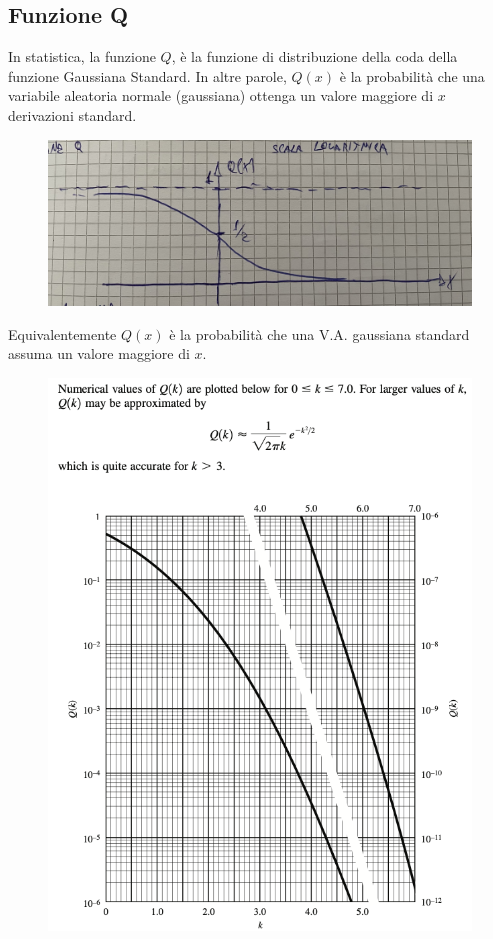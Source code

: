 \documentclass{article}
\begin{document}
\subsection{Funzione Q}

In statistica, la funzione \(Q\), è la funzione di distribuzione della coda della funzione Gaussiana Standard.
In altre parole, \(Q(x)\) è la probabilità che una variabile aleatoria normale (gaussiana) ottenga un valore maggiore di  \(x\) derivazioni standard.
\begin{figure}[h]
\centering
\includegraphics[scale=0.1]{1.Q1.jpeg}
\end{figure}

Equivalentemente \(Q(x)\) è la probabilità che una V.A. gaussiana standard assuma un valore maggiore di \(x\).
\begin{figure}[ht]
\centering
\includegraphics[scale=0.8]{2.Q2.png}
\end{figure}
\end{document}
